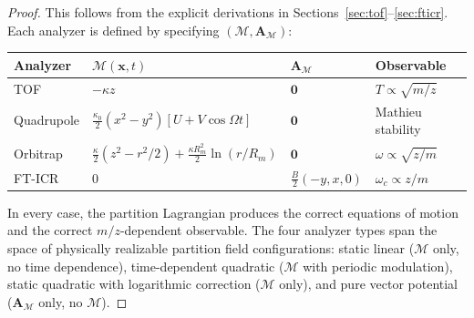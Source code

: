 \documentclass[11pt,twocolumn,a4paper]{article}
\theoremstyle{definition}
\theoremstyle{remark}
\newcommand{\Depth}{\mathcal{M}}
\newcommand{\Apartition}{\mathbf{A}_{\mathcal{M}}}
\begin{document}
\begin{proof}
This follows from the explicit derivations in Sections~\ref{sec:tof}--\ref{sec:fticr}. Each analyzer is defined by specifying $(\Depth, \Apartition)$:
\begin{center}
\begin{tabular}{@{}llll@{}}
\toprule
\textbf{Analyzer} & $\Depth(\mathbf{x},t)$ & $\Apartition$ & \textbf{Observable} \\
\midrule
TOF & $-\kappa z$ & $\mathbf{0}$ & $T \propto \sqrt{m/z}$ \\
Quadrupole & $\frac{\kappa_0}{2}(x^2-y^2)[U+V\cos\Omega t]$ & $\mathbf{0}$ & Mathieu stability \\
Orbitrap & $\frac{\kappa}{2}(z^2-r^2/2)+\frac{\kappa R_m^2}{2}\ln(r/R_m)$ & $\mathbf{0}$ & $\omega \propto \sqrt{z/m}$ \\
FT-ICR & $0$ & $\frac{B}{2}(-y,x,0)$ & $\omega_c \propto z/m$ \\
\bottomrule
\end{tabular}
\end{center}
In every case, the partition Lagrangian produces the correct equations of motion and the correct $m/z$-dependent observable. The four analyzer types span the space of physically realizable partition field configurations: static linear ($\Depth$ only, no time dependence), time-dependent quadratic ($\Depth$ with periodic modulation), static quadratic with logarithmic correction ($\Depth$ only), and pure vector potential ($\Apartition$ only, no $\Depth$).
\end{proof}
\end{document}

